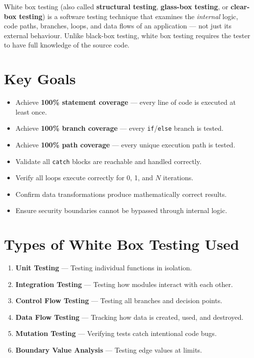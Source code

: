 \documentclass[12pt,a4paper]{report}
\begin{document}
\begin{tcolorbox}[infobox, title={What is White Box Testing?}]
White box testing (also called \textbf{structural testing}, \textbf{glass-box testing}, or
\textbf{clear-box testing}) is a software testing technique that examines the \emph{internal}
logic, code paths, branches, loops, and data flows of an application --- not just its external
behaviour. Unlike black-box testing, white box testing requires the tester to have full
knowledge of the source code.
\end{tcolorbox}

\section{Key Goals}

\begin{itemize}[leftmargin=1.5em]
  \item Achieve \textbf{100\% statement coverage} --- every line of code is executed at least once.
  \item Achieve \textbf{100\% branch coverage} --- every \texttt{if}/\texttt{else} branch is tested.
  \item Achieve \textbf{100\% path coverage} --- every unique execution path is tested.
  \item Validate all \texttt{catch} blocks are reachable and handled correctly.
  \item Verify all loops execute correctly for 0, 1, and $N$ iterations.
  \item Confirm data transformations produce mathematically correct results.
  \item Ensure security boundaries cannot be bypassed through internal logic.
\end{itemize}

\section{Types of White Box Testing Used}

\begin{enumerate}[leftmargin=1.5em]
  \item \textbf{Unit Testing} --- Testing individual functions in isolation.
  \item \textbf{Integration Testing} --- Testing how modules interact with each other.
  \item \textbf{Control Flow Testing} --- Testing all branches and decision points.
  \item \textbf{Data Flow Testing} --- Tracking how data is created, used, and destroyed.
  \item \textbf{Mutation Testing} --- Verifying tests catch intentional code bugs.
  \item \textbf{Boundary Value Analysis} --- Testing edge values at limits.
\end{enumerate}
\end{document}
